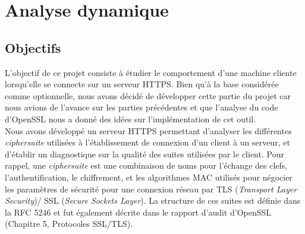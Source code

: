 \chapter{Analyse dynamique}

\section{Objectifs}
L'objectif de ce projet consiste à étudier le comportement d'une machine cliente lorsqu'elle se connecte sur un serveur HTTPS. Bien qu'à la base considérée comme optionnelle, nous avons décidé de développer cette partie du projet car nous avions de l'avance sur les parties précédentes et que l'analyse du code d'OpenSSL nous a donné des idées sur l'implémentation de cet outil. \\

Nous avons développé un serveur HTTPS permettant d'analyser les différentes \textit{ciphersuite} utilisées à l'établissement de connexion d'un client à un serveur, et d'établir un diagnostique sur la qualité des suites utilisées par le client. Pour rappel, une \textit{ciphersuite} est une combinaison de noms pour l'échange des clefs, l'authentification, le chiffrement, et les algorithmes MAC utilisés pour négocier les paramètres de sécurité pour une connexion réseau par TLS (\textit{Transport Layer Security})/ SSL (\textit{Secure Sockets Layer}). La structure de ces suites est définie dans la RFC 5246 \cite{rfc5246} et fut également décrite dans le rapport d'audit d'OpenSSL (Chapitre 5, Protocoles SSL/TLS).\\



